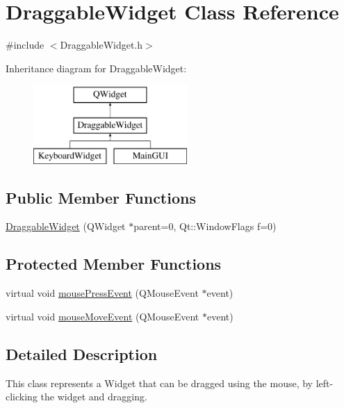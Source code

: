 \hypertarget{class_draggable_widget}{\section{Draggable\+Widget Class Reference}
\label{class_draggable_widget}
}


{\ttfamily \#include $<$Draggable\+Widget.\+h$>$}

Inheritance diagram for Draggable\+Widget\+:\begin{figure}[H]
\begin{center}
\leavevmode
\includegraphics[height=3.000000cm]{class_draggable_widget}
\end{center}
\end{figure}
\subsection*{Public Member Functions}
\begin{DoxyCompactItemize}
\item 
\hyperlink{class_draggable_widget_a2980778469300372e5ae6f275661e1ae}{Draggable\+Widget} (Q\+Widget $\ast$parent=0, Qt\+::\+Window\+Flags f=0)
\end{DoxyCompactItemize}
\subsection*{Protected Member Functions}
\begin{DoxyCompactItemize}
\item 
virtual void \hyperlink{class_draggable_widget_aff257b0727921eef2b9c306a524f3f07}{mouse\+Press\+Event} (Q\+Mouse\+Event $\ast$event)
\item 
virtual void \hyperlink{class_draggable_widget_a5fbd068a79a27a18eb8f7b3b8c58b9a1}{mouse\+Move\+Event} (Q\+Mouse\+Event $\ast$event)
\end{DoxyCompactItemize}


\subsection{Detailed Description}
This class represents a Widget that can be dragged using the mouse, by left-\/clicking the widget and dragging. 

